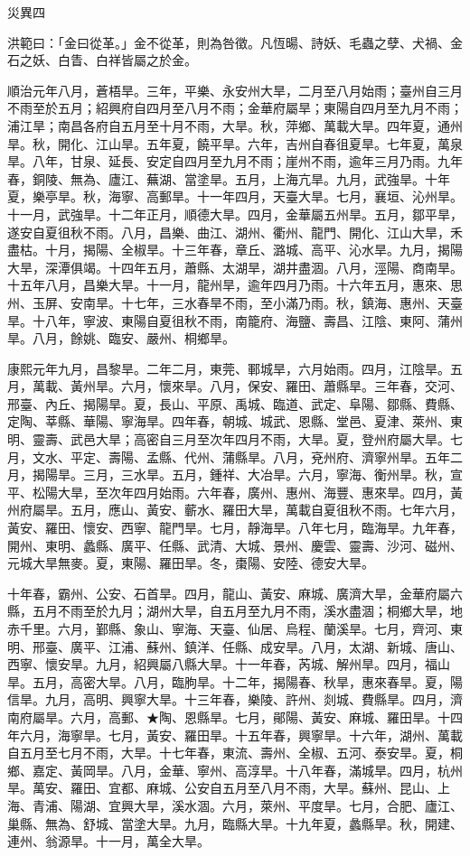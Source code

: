 
\begin{pinyinscope}
災異四

洪範曰：「金曰從革。」金不從革，則為咎徵。凡恆暘、詩妖、毛蟲之孽、犬禍、金石之妖、白眚、白祥皆屬之於金。

順治元年八月，蒼梧旱。三年，平樂、永安州大旱，二月至八月始雨；臺州自三月不雨至於五月；紹興府自四月至八月不雨；金華府屬旱；東陽自四月至九月不雨；浦江旱；南昌各府自五月至十月不雨，大旱。秋，萍鄉、萬載大旱。四年夏，通州旱。秋，開化、江山旱。五年夏，饒平旱。六年，吉州自春徂夏旱。七年夏，萬泉旱。八年，甘泉、延長、安定自四月至九月不雨；崖州不雨，逾年三月乃雨。九年春，銅陵、無為、廬江、蕪湖、當塗旱。五月，上海亢旱。九月，武強旱。十年夏，樂亭旱。秋，海寧、高郵旱。十一年四月，天臺大旱。七月，襄垣、沁州旱。十一月，武強旱。十二年正月，順德大旱。四月，金華屬五州旱。五月，鄒平旱，遂安自夏徂秋不雨。八月，昌樂、曲江、湖州、衢州、龍門、開化、江山大旱，禾盡枯。十月，揭陽、全椒旱。十三年春，章丘、潞城、高平、沁水旱。九月，揭陽大旱，深潭俱竭。十四年五月，蕭縣、太湖旱，湖井盡涸。八月，涇陽、商南旱。十五年八月，昌樂大旱。十一月，龍州旱，逾年四月乃雨。十六年五月，惠來、思州、玉屏、安南旱。十七年，三水春旱不雨，至小滿乃雨。秋，鎮海、惠州、天臺旱。十八年，寧波、東陽自夏徂秋不雨，南籠府、海鹽、壽昌、江陰、東阿、蒲州旱。八月，餘姚、臨安、嚴州、桐鄉旱。

康熙元年九月，昌黎旱。二年二月，東莞、鄆城旱，六月始雨。四月，江陰旱。五月，萬載、黃州旱。六月，懷來旱。八月，保安、羅田、蕭縣旱。三年春，交河、邢臺、內丘、揭陽旱。夏，長山、平原、禹城、臨道、武定、阜陽、鄒縣、費縣、定陶、莘縣、華陽、寧海旱。四年春，朝城、城武、恩縣、堂邑、夏津、萊州、東明、靈壽、武邑大旱；高密自三月至次年四月不雨，大旱。夏，登州府屬大旱。七月，文水、平定、壽陽、孟縣、代州、蒲縣旱。八月，兗州府、濟寧州旱。五年二月，揭陽旱。三月，三水旱。五月，鍾祥、大冶旱。六月，寧海、衡州旱。秋，宣平、松陽大旱，至次年四月始雨。六年春，廣州、惠州、海豐、惠來旱。四月，黃州府屬旱。五月，應山、黃安、蘄水、羅田大旱，萬載自夏徂秋不雨。七年六月，黃安、羅田、懷安、西寧、龍門旱。七月，靜海旱。八年七月，臨海旱。九年春，開州、東明、蠡縣、廣平、任縣、武清、大城、景州、慶雲、靈壽、沙河、磁州、元城大旱無麥。夏，東陽、羅田旱。冬，棗陽、安陸、德安大旱。

十年春，霸州、公安、石首旱。四月，龍山、黃安、麻城、廣濟大旱，金華府屬六縣，五月不雨至於九月；湖州大旱，自五月至九月不雨，溪水盡涸；桐鄉大旱，地赤千里。六月，鄞縣、象山、寧海、天臺、仙居、烏程、蘭溪旱。七月，齊河、東明、邢臺、廣平、江浦、蘇州、鎮洋、任縣、成安旱。八月，太湖、新城、唐山、西寧、懷安旱。九月，紹興屬八縣大旱。十一年春，芮城、解州旱。四月，福山旱。五月，高密大旱。八月，臨朐旱。十二年，揭陽春、秋旱，惠來春旱。夏，陽信旱。九月，高明、興寧大旱。十三年春，樂陵、許州、剡城、費縣旱。四月，濟南府屬旱。六月，高郵、★陶、恩縣旱。七月，鄖陽、黃安、麻城、羅田旱。十四年六月，海寧旱。七月，黃安、羅田旱。十五年春，興寧旱。十六年，湖州、萬載自五月至七月不雨，大旱。十七年春，東流、壽州、全椒、五河、泰安旱。夏，桐鄉、嘉定、黃岡旱。八月，金華、寧州、高淳旱。十八年春，滿城旱。四月，杭州旱。萬安、羅田、宜都、麻城、公安自五月至八月不雨，大旱。蘇州、昆山、上海、青浦、陽湖、宜興大旱，溪水涸。六月，萊州、平度旱。七月，合肥、廬江、巢縣、無為、舒城、當塗大旱。九月，臨縣大旱。十九年夏，蠡縣旱。秋，開建、連州、翁源旱。十一月，萬全大旱。


\end{pinyinscope}
